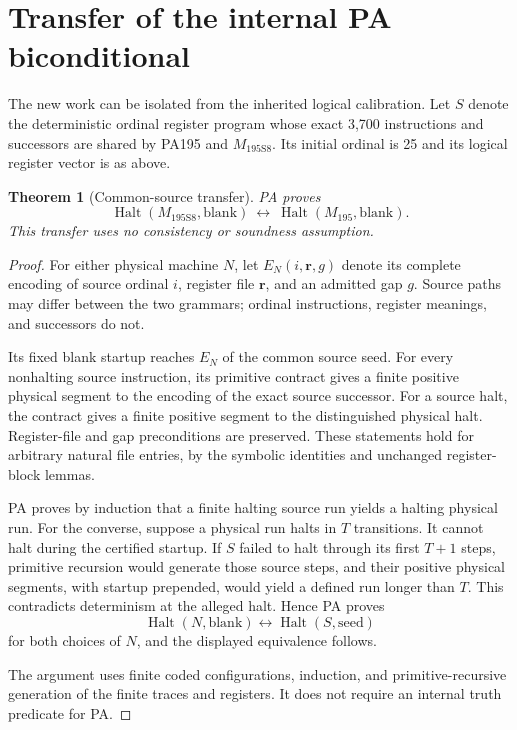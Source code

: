 \documentclass[11pt,letterpaper]{article}
\newtheorem{theorem}{Theorem}[section]
\newcommand{\Halt}{\operatorname{Halt}}
\newcommand{\Mnew}{M_{\mathrm{195S8}}}
\newcommand{\Mold}{M_{\mathrm{195}}}
\begin{document}
\section{Transfer of the internal PA biconditional}
\label{sec:transfer}
The new work can be isolated from the inherited logical calibration.
Let $S$ denote the deterministic ordinal register program whose exact
3,700 instructions and successors are shared by PA195 and $\Mnew$.
Its initial ordinal is 25 and its logical register vector is as above.

\begin{theorem}[Common-source transfer]
\label{thm:transfer}
PA proves
\[
\Halt(\Mnew,\mathrm{blank})
\ \longleftrightarrow\
\Halt(\Mold,\mathrm{blank}).
\]
This transfer uses no consistency or soundness assumption.
\end{theorem}
\begin{proof}
For either physical machine $N$, let $E_N(i,\mathbf r,g)$ denote its
complete encoding of source ordinal $i$, register file $\mathbf r$,
and an admitted gap $g$. Source paths may differ between the two
grammars; ordinal instructions, register meanings, and successors do not.

Its fixed blank startup reaches $E_N$ of the common source seed.
For every nonhalting source instruction, its primitive contract gives
a finite positive physical segment to the encoding of the exact source
successor. For a source halt, the contract gives a finite positive
segment to the distinguished physical halt. Register-file and gap
preconditions are preserved. These statements hold for arbitrary
natural file entries, by the symbolic identities and unchanged
register-block lemmas.

PA proves by induction that a finite halting source run yields a
halting physical run. For the converse, suppose a physical run halts
in $T$ transitions. It cannot halt during the certified startup.
If $S$ failed to halt through its first $T+1$ steps, primitive
recursion would generate those source steps, and their positive
physical segments, with startup prepended, would yield a defined run
longer than $T$. This contradicts determinism at the alleged halt.
Hence PA proves
\[
\Halt(N,\mathrm{blank})\longleftrightarrow\Halt(S,\mathrm{seed})
\]
for both choices of $N$, and the displayed equivalence follows.

The argument uses finite coded configurations, induction, and
primitive-recursive generation of the finite traces and registers.
It does not require an internal truth predicate for PA.
\end{proof}
\end{document}

